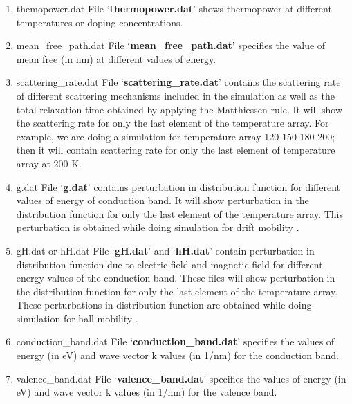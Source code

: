 \documentclass[12pt]{article}
\begin{document}
\begin{enumerate}
\item themopower.dat
\newline File \lq \textbf{thermopower.dat}\rq \hspace{0.5mm} shows thermopower at different temperatures or doping concentrations.

\item mean\_free\_path.dat
\newline File \lq \textbf{mean\_free\_path.dat}\rq \hspace{0.5mm} specifies the value of mean free (in nm) at different values of energy.

\item scattering\_rate.dat
\newline File \lq \textbf{scattering\_rate.dat}\rq \hspace{0.5mm} contains the scattering rate of different scattering mechanisms included in the simulation as well as the total relaxation time obtained by applying the Matthiessen rule. It will show the scattering rate for only the last element of the temperature array. For example, we are doing a simulation for temperature array 120 150 180 200; then it will contain scattering rate for only the last element of temperature array at 200 K. 

\item g.dat
\newline File \lq \textbf{g.dat}\rq \hspace{0.5mm} contains perturbation in distribution function for different values of energy of conduction band. It will show perturbation in the distribution function for only the last element of the temperature array. This perturbation is obtained while doing simulation for drift mobility \cite{rode1}.

\item gH.dat or hH.dat
\newline File \lq \textbf{gH.dat}\rq \hspace{0.5mm} and \lq \textbf{hH.dat}\rq \hspace{0.5mm} contain perturbation in distribution function due to electric field and magnetic field for different energy values of the conduction band. These files will show perturbation in the distribution function for only the last element of the temperature array. These perturbations in distribution function are obtained while doing simulation for hall mobility \cite{rode4}.

\item conduction\_band.dat
\newline File \lq \textbf{conduction\_band.dat}\rq \hspace{0.5mm} specifies the values of energy (in eV) and wave vector k values (in 1/nm) for the conduction band.

\item valence\_band.dat
\newline File \lq \textbf{valence\_band.dat}\rq \hspace{0.5mm} specifies the values of energy (in eV) and wave vector k values (in 1/nm) for the valence band. 

\end{enumerate}
\end{document}
